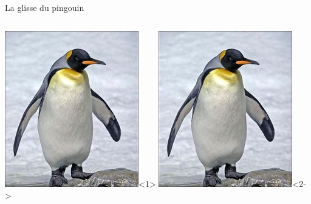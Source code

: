 \documentclass[10pt,a4paper]{beamer}
\begin{document}
\begin{frame}{La glisse du pingouin}
  \begin{columns}[c]
        \includegraphics[width = \textwidth]{pingouin.jpg}<1>
        \includegraphics[angle = 180, width = \textwidth]{pingouin.jpg}<2->

\end{columns}
\end{frame}
\end{document}
